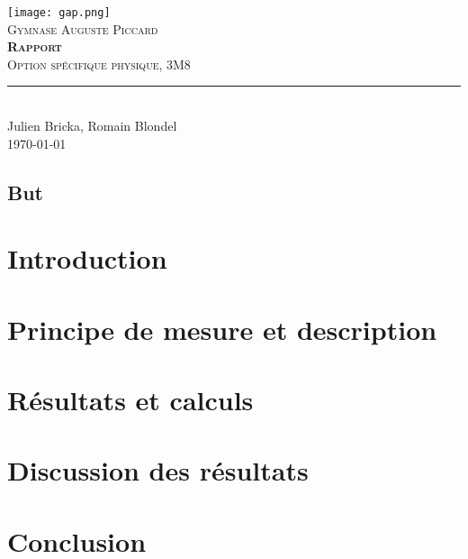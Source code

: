 \documentclass[11pt,titlepage]{article}
\begin{document}
\begin{titlepage}
	\centering
    \texttt{[image: gap.png]}\\[0.25cm] 	%
    \textsc{\LARGE Gymnase Auguste Piccard}\\ \vspace{\fill}
    \textbf{\textsc{\fontsize{50}{50}\selectfont Rapport}}\\ \vspace{\fill}		
	\textsc{\LARGE Option spécifique physique, 3M8}\\[0.4cm]
	\rule{\linewidth}{0.2 mm} \\[0.5 cm]
	Julien Bricka, Romain Blondel \\[2cm] \today
\end{titlepage}
\restoregeometry

\thispagestyle{numberonly}
\begin{summary}
\section*{But}

\end{summary}

\section{Introduction}


\section{Principe de mesure et description}


\section{Résultats et calculs}


\section{Discussion des résultats}


\section{Conclusion}

\end{document}
